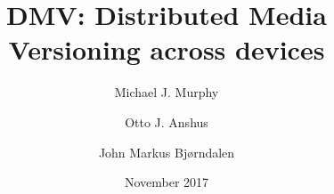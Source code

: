 \documentclass[usenglish]{nik}
\title{DMV: Distributed Media Versioning across devices}
\author{Michael J. Murphy \and Otto J. Anshus \and John Markus Bjørndalen}
\date{November 2017}
\begin{document}
\maketitle

\begin{abstract}

\end{abstract}









\printbibliography[]

\listoftodos
\end{document}
